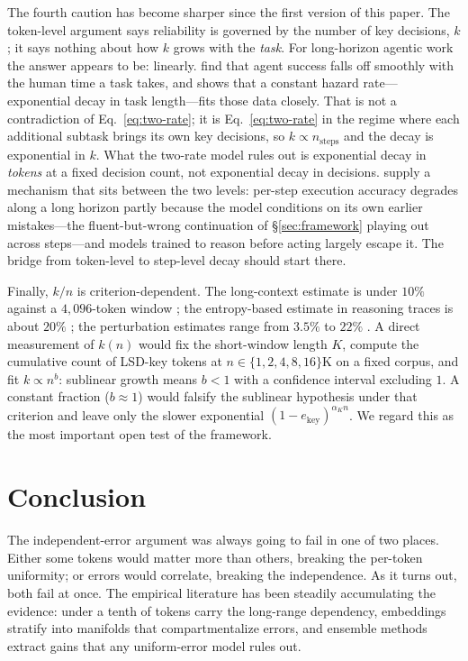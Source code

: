 The fourth caution has become sharper since the first version of this paper. The token-level argument says reliability is governed by the number of key decisions, $k$; it says nothing about how $k$ grows with the \emph{task}. For long-horizon agentic work the answer appears to be: linearly. \citet{kwa2025measuring} find that agent success falls off smoothly with the human time a task takes, and \citet{ord2025halflife} shows that a constant hazard rate---exponential decay in task length---fits those data closely. That is not a contradiction of Eq.~\ref{eq:two-rate}; it is Eq.~\ref{eq:two-rate} in the regime where each additional subtask brings its own key decisions, so $k \propto n_{\text{steps}}$ and the decay is exponential in $k$. What the two-rate model rules out is exponential decay in \emph{tokens} at a fixed decision count, not exponential decay in decisions. \citet{sinha2025illusion} supply a mechanism that sits between the two levels: per-step execution accuracy degrades along a long horizon partly because the model conditions on its own earlier mistakes---the fluent-but-wrong continuation of \S\ref{sec:framework} playing out across steps---and models trained to reason before acting largely escape it. The bridge from token-level to step-level decay should start there.

Finally, $k/n$ is criterion-dependent. The long-context estimate is under $10\%$ against a $4{,}096$-token window \citep{fang2024what}; the entropy-based estimate in reasoning traces is about $20\%$ \citep{wang2025beyond8020}; the perturbation estimates range from $3.5\%$ to $22\%$ \citep{jin2020textfooler}. A direct measurement of $k(n)$ would fix the short-window length $K$, compute the cumulative count of LSD-key tokens at $n \in \{1, 2, 4, 8, 16\}$K on a fixed corpus, and fit $k \propto n^{b}$: sublinear growth means $b < 1$ with a confidence interval excluding $1$. A constant fraction ($b \approx 1$) would falsify the sublinear hypothesis under that criterion and leave only the slower exponential $(1-e_{\text{key}})^{\alpha_K n}$. We regard this as the most important open test of the framework.

\section{Conclusion}
\label{sec:conclusion}

The independent-error argument was always going to fail in one of two places. Either some tokens would matter more than others, breaking the per-token uniformity; or errors would correlate, breaking the independence. As it turns out, both fail at once. The empirical literature has been steadily accumulating the evidence: under a tenth of tokens carry the long-range dependency, embeddings stratify into manifolds that compartmentalize errors, and ensemble methods extract gains that any uniform-error model rules out.

